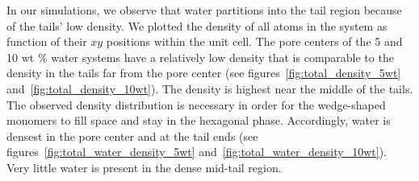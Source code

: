 \documentclass{article}
\begin{document}
  In our simulations, we observe that water partitions into the tail region
  because of the tails' low density. We plotted the density of all atoms in 
  the system as function of their $xy$ positions within the unit cell. The 
  pore centers of the 5 and 10 wt \% water systems have a relatively low density
  that is comparable to the density in the tails far from the pore center
  (see figures~\ref{fig:total_density_5wt} and~\ref{fig:total_density_10wt}).
  The density is highest near the middle of the tails. The observed density distribution
  is necessary in order for the wedge-shaped monomers to fill space and stay in
  the hexagonal phase. Accordingly, water is densest in the pore center and at 
  the tail ends (see figures~\ref{fig:total_water_density_5wt} 
  and~\ref{fig:total_water_density_10wt}). Very little water is present in the 
  dense mid-tail region. 
  
\end{document}
